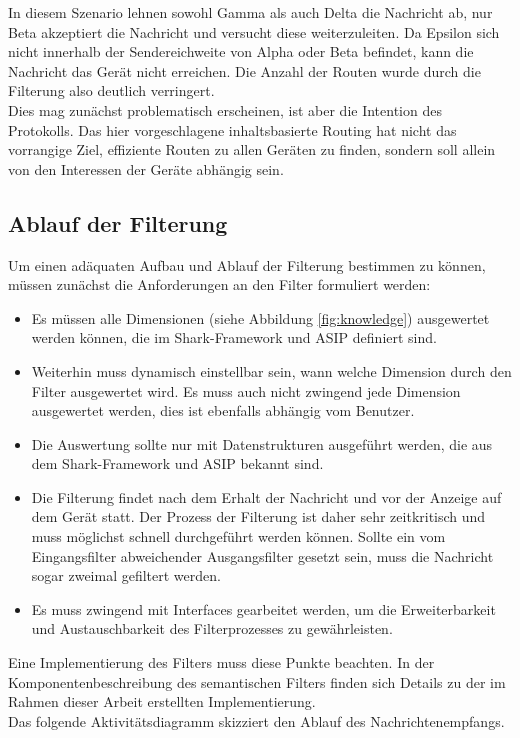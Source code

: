 In diesem Szenario lehnen sowohl Gamma als auch Delta die Nachricht ab, nur Beta akzeptiert die Nachricht und versucht diese weiterzuleiten. Da Epsilon sich nicht innerhalb der Sendereichweite von Alpha oder Beta befindet, kann die Nachricht das Gerät nicht erreichen. Die Anzahl der Routen wurde durch die Filterung also deutlich verringert. 
\\Dies mag zunächst problematisch erscheinen, ist aber die Intention des Protokolls. Das hier vorgeschlagene inhaltsbasierte Routing hat nicht das vorrangige Ziel, effiziente Routen zu allen Geräten zu finden, sondern soll allein von den Interessen der Geräte abhängig sein. \newpage
\subsection{Ablauf der Filterung}
\label{subsec:ablaufFilterung}
Um einen adäquaten Aufbau und Ablauf der Filterung bestimmen zu können, müssen zunächst die Anforderungen an den Filter formuliert werden:
\begin{itemize}
	\item Es müssen alle Dimensionen (siehe Abbildung \ref{fig:knowledge}) ausgewertet werden können, die im Shark-Framework und ASIP definiert sind.
	\item Weiterhin muss dynamisch einstellbar sein, wann welche Dimension durch den Filter ausgewertet wird. Es muss auch nicht zwingend jede Dimension ausgewertet werden, dies ist ebenfalls abhängig vom Benutzer.
	\item Die Auswertung sollte nur mit Datenstrukturen ausgeführt werden, die aus dem Shark-Framework und ASIP bekannt sind.
	\item Die Filterung findet nach dem Erhalt der Nachricht und vor der Anzeige auf dem Gerät statt. Der Prozess der Filterung ist daher sehr zeitkritisch und muss möglichst schnell durchgeführt werden können. Sollte ein vom Eingangsfilter abweichender Ausgangsfilter gesetzt sein, muss die Nachricht sogar zweimal gefiltert werden.
	\item Es muss zwingend mit Interfaces gearbeitet werden, um die Erweiterbarkeit und Austauschbarkeit des Filterprozesses zu gewährleisten.
\end{itemize}
Eine Implementierung des Filters muss diese Punkte beachten. In der Komponentenbeschreibung des semantischen Filters finden sich Details zu der im Rahmen dieser Arbeit erstellten Implementierung.
\\Das folgende Aktivitätsdiagramm skizziert den Ablauf des Nachrichtenempfangs.
